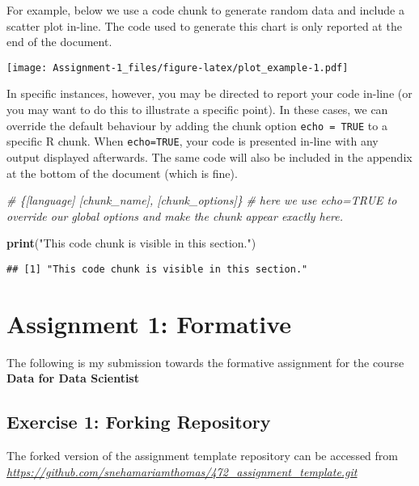 \documentclass[
]{article}
\newenvironment{Shaded}{\begin{snugshade}}{\end{snugshade}}
\newcommand{\CommentTok}[1]{\textcolor[rgb]{0.56,0.35,0.01}{\textit{#1}}}
\newcommand{\FunctionTok}[1]{\textcolor[rgb]{0.13,0.29,0.53}{\textbf{#1}}}
\newcommand{\NormalTok}[1]{#1}
\newcommand{\StringTok}[1]{\textcolor[rgb]{0.31,0.60,0.02}{#1}}
\begin{document}
For example, below we use a code chunk to generate random data and
include a scatter plot in-line. The code used to generate this chart is
only reported at the end of the document.

\texttt{[image: Assignment-1\_files/figure-latex/plot\_example-1.pdf]}

In specific instances, however, you may be directed to report your code
in-line (or you may want to do this to illustrate a specific point). In
these cases, we can override the default behaviour by adding the chunk
option \texttt{echo\ =\ TRUE} to a specific R chunk. When
\texttt{echo=TRUE}, your code is presented in-line with any output
displayed afterwards. The same code will also be included in the
appendix at the bottom of the document (which is fine).

\begin{Shaded}
\begin{Highlighting}[]
\CommentTok{\# \{[language] [chunk\_name], [chunk\_options]\}}
\CommentTok{\# here we use echo=TRUE to override our global options and make the chunk appear exactly here. }

\FunctionTok{print}\NormalTok{(}\StringTok{"This code chunk is visible in this section."}\NormalTok{)}
\end{Highlighting}
\end{Shaded}

\begin{verbatim}
## [1] "This code chunk is visible in this section."
\end{verbatim}

\hypertarget{assignment-1-formative}{%
\section{\texorpdfstring{\textbf{Assignment 1:
Formative}}{Assignment 1: Formative}}\label{assignment-1-formative}}

The following is my submission towards the formative assignment for the
course \textbf{Data for Data Scientist}

\hypertarget{exercise-1-forking-repository}{%
\subsection{\texorpdfstring{\textbf{Exercise 1: Forking
Repository}}{Exercise 1: Forking Repository}}\label{exercise-1-forking-repository}}

The forked version of the assignment template repository can be accessed
from
\emph{\url{https://github.com/snehamariamthomas/472_assignment_template.git}}
\end{document}
